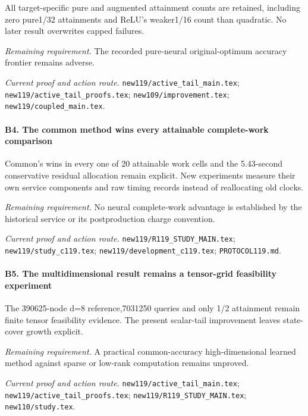 All target-specific pure and augmented attainment counts are retained, including zero pure1/32 attainments and ReLU's weaker1/16 count than quadratic. No later result overwrites capped failures.

\par\emph{Remaining requirement.} The recorded pure-neural original-optimum accuracy frontier remains adverse.

\par\emph{Current proof and action route.} \nolinkurl{new119/active_tail_main.tex}; \nolinkurl{new119/active_tail_proofs.tex}; \nolinkurl{new109/improvement.tex}; \nolinkurl{new119/coupled_main.tex}.

\paragraph{B4. The common method wins every attainable complete-work comparison}

Common's wins in every one of 20 attainable work cells and the 5.43-second conservative residual allocation remain explicit. New experiments measure their own service components and raw timing records instead of reallocating old clocks.

\par\emph{Remaining requirement.} No neural complete-work advantage is established by the historical service or its postproduction charge convention.

\par\emph{Current proof and action route.} \nolinkurl{new119/R119_STUDY_MAIN.tex}; \nolinkurl{new119/study_c119.tex}; \nolinkurl{new119/development_c119.tex}; \nolinkurl{PROTOCOL119.md}.

\paragraph{B5. The multidimensional result remains a tensor-grid feasibility experiment}

The 390625-node d=8 reference,7031250 queries and only 1/2 attainment remain finite tensor feasibility evidence. The present scalar-tail improvement leaves state-cover growth explicit.

\par\emph{Remaining requirement.} A practical common-accuracy high-dimensional learned method against sparse or low-rank computation remains unproved.

\par\emph{Current proof and action route.} \nolinkurl{new119/active_tail_main.tex}; \nolinkurl{new119/active_tail_proofs.tex}; \nolinkurl{new119/R119_STUDY_MAIN.tex}; \nolinkurl{new110/study.tex}.

